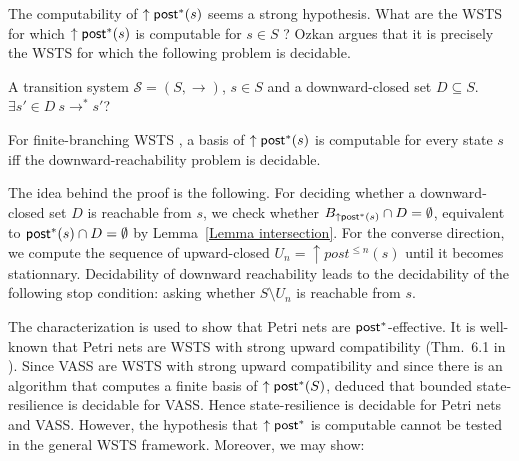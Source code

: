 \iffalse
\alain{definir downward reachability problem.....
downward-closed problem given a state $s$ of a WSTS
with strong upward compatibility 
and a decidable downward-closed set $D$, it can be decided whether $\exists s' \in D ~ s \to^* s'$. }
\fi


The computability of $\uparrow \textsf{post}^*(s)$ seems a strong hypothesis. What are the WSTS for which $\uparrow \textsf{post}^*(s)$ is computable for $s \in S$ ?
Ozkan \cite{DBLP:conf/gg/Ozkan22} argues that it is precisely the WSTS for which the following problem is decidable.

{A transition system $\mathscr{S}=(S,\rightarrow)$, $s \in S$ and a downward-closed set $D
\subseteq S$.}
{$\exists s' \in D ~ s \to^* s'$? \newline}



\begin{proposition}
For finite-branching WSTS%
, a basis of $\uparrow \textsf{post}^*(s)$ is computable for every state $s$ iff the downward-reachability problem is decidable.
\end{proposition}

The idea behind the proof is the following. For deciding whether a downward-closed set $D$ is reachable from $s$, we check whether
$B_{\uparrow \textsf{post}^*(s)} \cap D = \emptyset$, equivalent to $\textsf{post}^*(s)\cap D = \emptyset$ by
Lemma~\ref{Lemma intersection}. For the converse direction, we compute the sequence of upward-closed
$U_n = \uparrow post^{\leq n}(s)$ until it becomes stationnary. 
Decidability of downward reachability leads to the decidability of the following stop condition:
asking whether $S \setminus U_n$ is reachable from $s$.


The characterization is used to show that Petri nets are $\textsf{post}^*$-effective. It is well-known that Petri nets are WSTS with strong upward compatibility (Thm.~6.1 in \cite{DBLP:journals/tcs/FinkelS01}). 
Since VASS are WSTS with strong upward compatibility and since there is an algorithm that computes a finite basis of  $\uparrow \textsf{post}^*(S)$, \cite{DBLP:conf/gg/Ozkan22} deduced that bounded state-resilience is decidable for VASS.
Hence state-resilience is decidable for Petri nets and VASS.
However, the hypothesis that $\uparrow \textsf{post}^*$ is computable cannot be tested in the general WSTS framework. Moreover, we may show:

